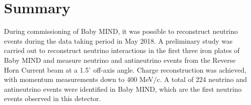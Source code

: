 \section{Summary}
During commissioning of Baby MIND, it was possible to reconstruct neutrino events during the data taking period in May 2018. A preliminary study was carried out to reconstruct neutrino interactions in the first three iron plates of Baby MIND and measure neutrino and antineutrino events from the Reverse Horn Current beam at a 1.5$^\circ$ off-axis angle. Charge reconstruction was achieved, with momentum measurements down to 400 MeV/c. A total of 224 neutrino and antineutrino events were identified in  Baby MIND, which are the first neutrino events observed in this detector.
